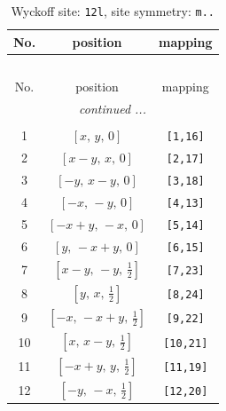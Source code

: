 \documentclass[fleqn,8pt]{jsarticle}
\begin{document}
\begin{longtable}{ccc}
\caption{Wyckoff site: {\tt 12l}, site symmetry: {\tt m..}}
 \\
 \hline \hline
No. & position & mapping \\ \hline \endfirsthead

\multicolumn{2}{l}{\tablename\ \thetable{}} \\
 \hline \hline
No. & position & mapping \\ \hline \endhead

 \hline \hline
\multicolumn{2}{r}{\footnotesize\it continued ...} \\ \endfoot

 \hline \hline
\multicolumn{2}{r}{} \\ \endlastfoot

1 & $\left[ x,\, y,\, 0 \right]$ & {\tt [1,16]} \\ \hline
2 & $\left[ x - y,\, x,\, 0 \right]$ & {\tt [2,17]} \\ \hline
3 & $\left[ - y,\, x - y,\, 0 \right]$ & {\tt [3,18]} \\ \hline
4 & $\left[ - x,\, - y,\, 0 \right]$ & {\tt [4,13]} \\ \hline
5 & $\left[ - x + y,\, - x,\, 0 \right]$ & {\tt [5,14]} \\ \hline
6 & $\left[ y,\, - x + y,\, 0 \right]$ & {\tt [6,15]} \\ \hline
7 & $\left[ x - y,\, - y,\, \frac{1}{2} \right]$ & {\tt [7,23]} \\ \hline
8 & $\left[ y,\, x,\, \frac{1}{2} \right]$ & {\tt [8,24]} \\ \hline
9 & $\left[ - x,\, - x + y,\, \frac{1}{2} \right]$ & {\tt [9,22]} \\ \hline
10 & $\left[ x,\, x - y,\, \frac{1}{2} \right]$ & {\tt [10,21]} \\ \hline
11 & $\left[ - x + y,\, y,\, \frac{1}{2} \right]$ & {\tt [11,19]} \\ \hline
12 & $\left[ - y,\, - x,\, \frac{1}{2} \right]$ & {\tt [12,20]} \\
\end{longtable}
\renewcommand{\arraystretch}{1.2}
\end{document}
